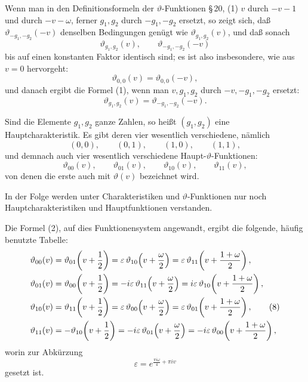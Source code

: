 \documentclass[11pt]{article}
\providecommand{\eps}{\varepsilon}
\providecommand{\eps}{\varepsilon}
\begin{document}
Wenn man in den Definitionsformeln der $\vartheta$-Funktionen \S\,20, (1) $v$ durch $-v-1$ und durch $-v-\omega$, ferner $g_1,g_2$ durch $-g_1,-g_2$ ersetzt, so zeigt sich, daß $\vartheta_{-g_1,-g_2}(-v)$ denselben Bedingungen genügt wie $\vartheta_{g_1,g_2}(v)$, und daß sonach
\[
\vartheta_{g_1,g_2}(v),\qquad \vartheta_{-g_1,-g_2}(-v)
\]
bis auf einen konstanten Faktor identisch sind; es ist also insbesondere, wie aus $v=0$ hervorgeht:
\[
\vartheta_{0,0}(v)=\vartheta_{0,0}(-v),
\]
und danach ergibt die Formel (1), wenn man $v,g_1,g_2$ durch $-v,-g_1,-g_2$ ersetzt:
\begin{equation}
\vartheta_{g_1,g_2}(v)=\vartheta_{-g_1,-g_2}(-v).
\tag{6}
\end{equation}

Sind die Elemente $g_1,g_2$ ganze Zahlen, so heißt $(g_1,g_2)$ eine Hauptcharakteristik. Es gibt deren vier wesentlich verschiedene, nämlich
\[
(0,0),\qquad (0,1),\qquad (1,0),\qquad (1,1),
\]
und demnach auch vier wesentlich verschiedene Haupt-$\vartheta$-Funktionen:
\begin{equation}
\vartheta_{00}(v),\qquad \vartheta_{01}(v),\qquad \vartheta_{10}(v),\qquad \vartheta_{11}(v),
\tag{7}
\end{equation}
von denen die erste auch mit $\vartheta(v)$ bezeichnet wird.

In der Folge werden unter Charakteristiken und $\vartheta$-Funktionen nur noch Hauptcharakteristiken und Hauptfunktionen verstanden.

Die Formel (2), auf dies Funktionensystem angewandt, ergibt die folgende, häufig benutzte Tabelle:
\begin{align}
\vartheta_{00}(v)&=\vartheta_{01}\!\left(v+\frac12\right)=\eps\,\vartheta_{10}\!\left(v+\frac{\omega}{2}\right)=\eps\,\vartheta_{11}\!\left(v+\frac{1+\omega}{2}\right),\notag\\
\vartheta_{01}(v)&=\vartheta_{00}\!\left(v+\frac12\right)=-i\eps\,\vartheta_{11}\!\left(v+\frac{\omega}{2}\right)=i\eps\,\vartheta_{10}\!\left(v+\frac{1+\omega}{2}\right),\notag\\
\vartheta_{10}(v)&=\vartheta_{11}\!\left(v+\frac12\right)=\eps\,\vartheta_{00}\!\left(v+\frac{\omega}{2}\right)=\eps\,\vartheta_{01}\!\left(v+\frac{1+\omega}{2}\right),\tag{8}\\
\vartheta_{11}(v)&=-\vartheta_{10}\!\left(v+\frac12\right)=-i\eps\,\vartheta_{01}\!\left(v+\frac{\omega}{2}\right)=-i\eps\,\vartheta_{00}\!\left(v+\frac{1+\omega}{2}\right),
\notag
\end{align}
worin zur Abkürzung
\[
\eps=e^{\frac{\pi i\omega}{4}+\pi i v}
\]
gesetzt ist.
\end{document}
